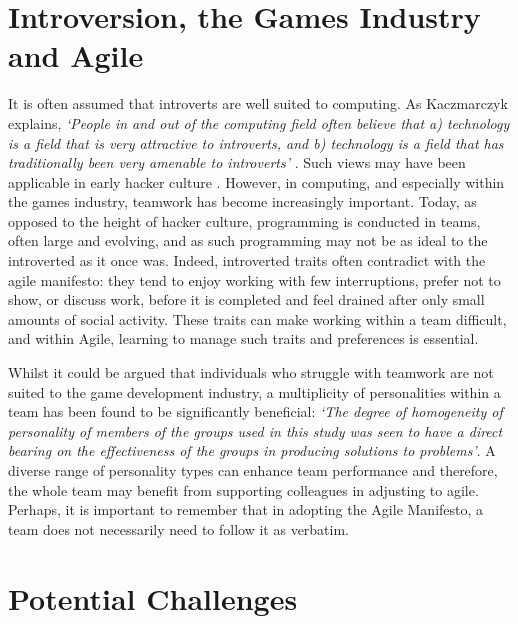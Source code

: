 \documentclass{scrartcl}
\begin{document}
\section{Introversion, the Games Industry and Agile}

It is often assumed that introverts are well suited to computing. As Kaczmarczyk explains, \textit{`People in and out of the computing field often believe that a) technology is a field that is very attractive to introverts, and b) technology is a field that has traditionally been very amenable to introverts'} \cite[p. 24]{Kacz}. Such views may have been applicable in early hacker culture \cite{Kacz}. However, in computing, and especially within the games industry, teamwork has become increasingly important. Today, as opposed to the height of hacker culture, programming is conducted in teams, often large and evolving, and as such programming may not be as ideal to the introverted as it once was. Indeed, introverted traits often contradict with the agile manifesto: they tend to enjoy working with few interruptions, prefer not to show, or discuss work, before it is completed and feel drained after only small amounts of social activity\cite{Cain}.  These traits can make working within a team difficult, and within Agile, learning to manage such traits and preferences is essential.

Whilst it could be argued that individuals who struggle with teamwork are not suited to the game development industry, a multiplicity of personalities within a team has been found to be significantly beneficial: \textit{`The degree of homogeneity of personality of members of the groups used in this study was seen to have a direct bearing on the effectiveness of the groups in producing solutions to problems'}\cite[p. 27]{Hoffman}. A diverse range of personality types can enhance team performance and therefore, the whole team may benefit from supporting colleagues in adjusting to agile. Perhaps, it is important to remember that in adopting the Agile Manifesto, a team does not necessarily need to follow it as verbatim. 

\section{Potential Challenges}
\end{document}
